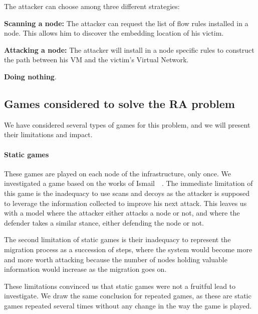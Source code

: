 The attacker can choose among three different strategies:
\begin{description}
\item \textbf{Scanning a node: } The attacker can request the list of  flow rules installed in a node. This allows him to discover the embedding location of his victim.
\item \textbf{Attacking a node: } The attacker will install in a node specific rules to construct the path between his VM and the victim's Virtual Network.
\item \textbf{Doing nothing}.
\end{description}



\subsection{Games considered to solve the RA problem}
We have considered several types of games for this problem, and we will present their limitations and impact.

\paragraph{Static games} These games are played on each node of the infrastructure, only once. We investigated a game based on the works of Ismail~\etal~\cite{Chen2009,interdep-ismail2017}. The immediate limitation of this game is the inadequacy to use scans and decoys as the attacker is supposed to leverage the information collected to improve his next attack. This leaves us with a model where the attacker either attacks a node or not, and where the defender takes a similar stance, either defending the node or not.

The second limitation of static games is their inadequacy to represent the migration process as a succession of steps, where the system would become more and more worth attacking because the number of nodes holding valuable information would increase as the migration goes on.


These limitations convinced us that static games were not a fruitful lead to investigate.
We draw the same conclusion for repeated games, as these are static games repeated several times without any change in the way the game is played.

